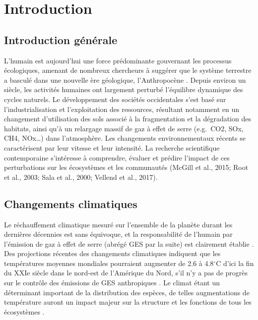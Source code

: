 \francais
\chapter*{Introduction}

\hypertarget{introduction-guxe9nuxe9rale}{%
\section{Introduction générale}\label{introduction-guxe9nuxe9rale}}

L'humain est aujourd'hui une force prédominante gouvernant les processus
écologiques, amenant de nombreux chercheurs à suggérer que le système
terrestre a basculé dans une nouvelle ère géologique, l'Anthropocène
\citep{crutzen_geology_2002}. Depuis environ un siècle, les activités
humaines ont largement perturbé l'équilibre dynamique des cycles
naturels. Le développement des sociétés occidentales s'est basé sur
l'industrialisation et l'exploitation des ressources, résultant
notamment en un changement d'utilisation des sols associé à la
fragmentation et la dégradation des habitats, ainsi qu'à un relargage
massif de gaz à effet de serre (e.g.~CO2, SOx, CH4, NOx\ldots) dans
l'atmosphère. Les changements environnementaux récents se caractérisent
par leur vitesse et leur intensité. La recherche scientifique
contemporaine s'intéresse à comprendre, évaluer et prédire l'impact de
ces perturbations sur les écosystèmes et les communautés (McGill et al.,
2015; Root et al., 2003; Sala et al., 2000; Vellend et al., 2017).

\hypertarget{changements-climatiques}{%
\section{Changements climatiques}\label{changements-climatiques}}

Le réchauffement climatique mesuré sur l'ensemble de la planète durant
les dernières décennies est sans équivoque, et la responsabilité de
l'humain par l'émission de gaz à effet de serre (abrégé GES par la
suite) est clairement établie \citep{ipcc_climate_2014}. Des projections
récentes des changements climatiques indiquent que les températures
moyennes mondiales pourraient augmenter de 2.6 à 4.8\(^{\circ}\)C d'ici
la fin du XXIe siècle dans le nord-est de l'Amérique du Nord, s'il n'y a
pas de progrès sur le contrôle des émissions de GES anthropiques
\citep{ipcc_climate_2014}. Le climat étant un déterminant important de
la distribution des espèces, de telles augmentations de température
auront un impact majeur sur la structure et les fonctions de tous les
écosystèmes \citep{bellard_impacts_2012, gauthier_vulnerability_2015}.

